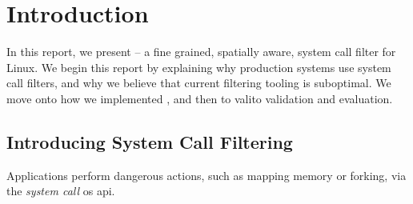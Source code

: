 \section{Introduction}

In this report, we present \af -- a fine grained, spatially aware, system call
filter for Linux. We begin this report by explaining why production systems use
system call filters, and why we believe that current filtering tooling is
suboptimal. We move onto how we implemented \af, and then to valito validation
and evaluation.

\subsection{Introducing System Call Filtering}

Applications perform dangerous actions, such as mapping memory or forking, via the
\textit{system call} \ac{os} \ac{api}. 

